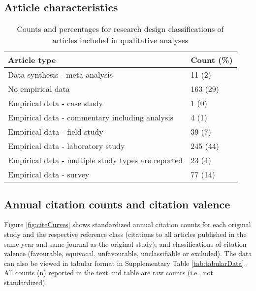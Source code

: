 \documentclass[
  american,
  ,man,floatsintext]{apa6}
\begin{document}
\hypertarget{article-characteristics}{%
\subsection{Article characteristics}\label{article-characteristics}}

\begin{table}[tbp]

\begin{center}
\begin{threeparttable}

\caption{\label{tab:articleTypes}Counts and percentages for research design classifications of articles included in qualitative analyses}

\begin{tabular}{ll}
\toprule
Article type & \multicolumn{1}{c}{Count (\%)}\\
\midrule
Data synthesis - meta-analysis & 11 (2)\\
No empirical data & 163 (29)\\
Empirical data - case study & 1 (0)\\
Empirical data - commentary including analysis & 4 (1)\\
Empirical data - field study & 39 (7)\\
Empirical data - laboratory study & 245 (44)\\
Empirical data - multiple study types are reported & 23 (4)\\
Empirical data - survey & 77 (14)\\
\bottomrule
\end{tabular}

\end{threeparttable}
\end{center}

\end{table}

\hypertarget{annual-citation-counts-and-citation-valence}{%
\subsection{Annual citation counts and citation valence}\label{annual-citation-counts-and-citation-valence}}

Figure \ref{fig:citeCurves} shows standardized annual citation counts for each original study and the respective reference class (citations to all articles published in the same year and same journal as the original study), and classifications of citation valence (favourable, equivocal, unfavourable, unclassifiable or excluded). The data can also be viewed in tabular format in Supplementary Table \ref{tab:tabularData}. All counts (n) reported in the text and table are raw counts (i.e., not standardized).
\end{document}
